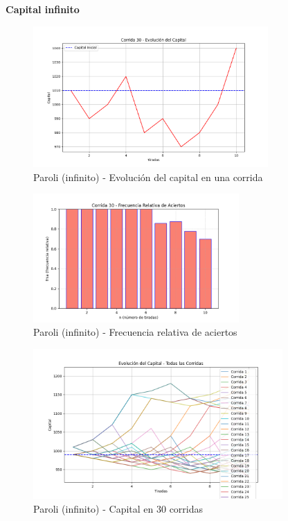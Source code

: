 \documentclass{article}
\begin{document}
\textbf{Capital infinito}

\begin{figure}
    \centering
    \includegraphics[width=0.8\textwidth]{./images/capital_corrida_30_p_i.png}
    \caption{Paroli (infinito) - Evolución del capital en una corrida}
\end{figure}

\begin{figure}
    \centering
    \includegraphics[width=0.7\textwidth]{./images/frsa_corrida_30_p_f.png}
    \caption{Paroli (infinito) - Frecuencia relativa de aciertos}
\end{figure}

\begin{figure}
    \centering
    \includegraphics[width=0.85\textwidth]{./images/capital_todas_corridas_p_i.png}
    \caption{Paroli (infinito) - Capital en 30 corridas}
\end{figure}
\end{document}
